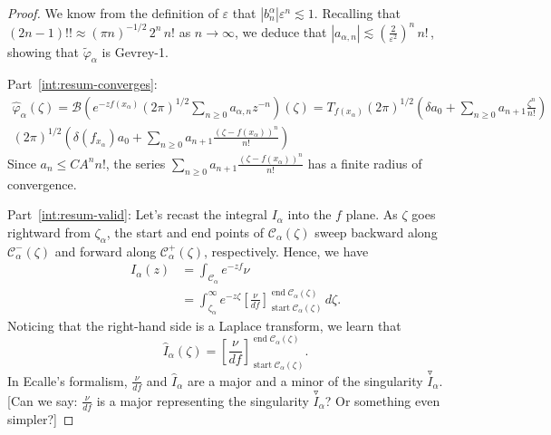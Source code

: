 \documentclass{article}
\begin{document}
\begin{proof}
We know from the definition of $\varepsilon$ that $\left|b_n^\alpha\right| \varepsilon^n \lesssim 1$. Recalling that $(2n - 1)!! \approx (\pi n)^{-1/2}\,2^n\,n!$ as $n \to \infty$, we deduce that $|a_{\alpha,n}| \lesssim \left(\tfrac{2}{\varepsilon^2}\right)^n\,n!\,$, showing that $\tilde{\varphi}_\alpha$ is Gevrey-1.

Part~\eqref{int:resum-converges}: \begin{align*}
\hat{\varphi}_\alpha(\zeta)=\mathcal{B}\left(e^{-zf(x_\alpha)}(2\pi)^{1/2} \sum_{n\geq 0}a_{\alpha,n}z^{-n}\right)(\zeta)=T_{f(x_\alpha)}(2\pi)^{1/2} \left(\delta a_0+\sum_{n\geq 0}a_{n+1}\frac{\zeta^n}{n!}\right)\\
(2\pi)^{1/2} \left(\delta(f_{x_\alpha}) a_0+\sum_{n\geq 0}a_{n+1}\frac{(\zeta-f(x_\alpha))^n}{n!}\right)
\end{align*}
Since $a_{n}\leq CA^nn!$, the series $\sum_{n\geq 0}a_{n+1}\frac{(\zeta-f(x_\alpha))^n}{n!}$ has a finite radius of convergence. 

Part~\eqref{int:resum-valid}: Let's recast the integral $I_\alpha$ into the $f$ plane. As $\zeta$ goes rightward from $\zeta_\alpha$, the start and end points of $\mathcal{C}_\alpha(\zeta)$ sweep backward along $\mathcal{C}^-_\alpha(\zeta)$ and forward along $\mathcal{C}^+_\alpha(\zeta)$, respectively. Hence, we have
\begin{align*}
I_\alpha(z) & = \int_{\mathcal{C}_{\alpha}} e^{-zf} \nu \\
& = \int_{\zeta_\alpha}^\infty e^{-z\zeta} \left[\frac{\nu}{df}\right]_{\operatorname{start} \mathcal{C}_\alpha(\zeta)}^{\operatorname{end} \mathcal{C}_\alpha(\zeta)}\,d\zeta.
\end{align*}
Noticing that the right-hand side is a Laplace transform, we learn that
\begin{equation}\label{thimble-difference}
\hat{I}_\alpha(\zeta) = \left[\frac{\nu}{df}\right]_{\operatorname{start} \mathcal{C}_\alpha(\zeta)}^{\operatorname{end} \mathcal{C}_\alpha(\zeta)}.
\end{equation}
\color{Aquamarine}
In Ecalle's formalism, $\frac{\nu}{df}$ and $\hat{I}_\alpha$ are a major and a minor of the singularity $\overset{\triangledown}{I}_\alpha$. [Can we say: $\frac{\nu}{df}$ is a major representing the singularity $\overset{\triangledown}{I}_\alpha$? Or something even simpler?]
\color{black}


\end{proof}
\end{document}
